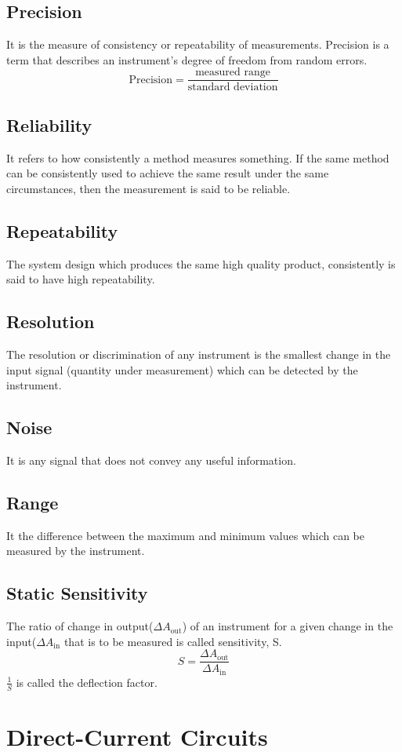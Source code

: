 	\section{Precision}
	It is the measure of consistency or repeatability of measurements. Precision is a term that describes an instrument’s degree of freedom from random errors.
	\[\text{Precision}=\frac{\text{measured range}}{\text{standard deviation}}\]
	\section{Reliability}
	It refers to how consistently a method measures something. If the same method can be consistently used to achieve the same result under the same circumstances, then the measurement is said to be reliable.
	\section{Repeatability}
	The system design which produces the same high quality product, consistently is said to have high repeatability.
	\section{Resolution}
	The resolution or discrimination of any instrument is the smallest change in the input signal (quantity under measurement) which can be detected by the instrument.
	\section{Noise}
	It is any signal that does not convey any useful information.
	\section{Range}
	It the difference between the maximum and minimum values which can be measured by the instrument.
	\section{Static Sensitivity}
	The ratio of change in output($\Delta A_{\text{out}}$) of an instrument for a given change in the input($\Delta A_{\text{in}}$ that is to be measured is called sensitivity, S.
	\[S=\frac{\Delta A_{\text{out}}}{\Delta A_{\text{in}}}\]
	$\frac{1}{S}$ is called the deflection factor.
	\chapter{Direct-Current Circuits}
